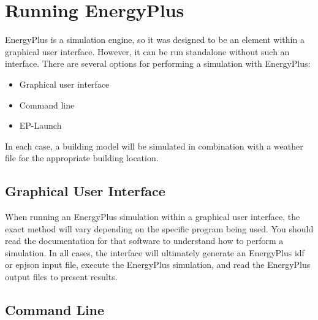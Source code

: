 \section{Running EnergyPlus}

EnergyPlus is a simulation engine, so it was designed to be an element
within a graphical user interface. However, it can be run standalone
without such an interface. There are several options for performing
a simulation with EnergyPlus:
\begin{itemize}
\item Graphical user interface
\item Command line
\item EP-Launch
\end{itemize}
In each case, a building model will be simulated in combination with
a weather file for the appropriate building location.

\subsection*{Graphical User Interface}

When running an EnergyPlus simulation within a graphical user interface,
the exact method will vary depending on the specific program being
used. You should read the documentation for that software to understand
how to perform a simulation. In all cases, the interface will ultimately
generate an EnergyPlus idf or epjson input file, execute the EnergyPlus
simulation, and read the EnergyPlus output files to present results.

\subsection*{Command Line}

